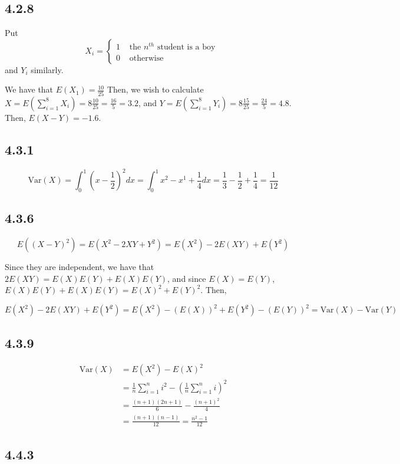 \documentclass[12pt,letterpaper]{article}
\theoremstyle{definition}
\newcommand{\var}[1]{\text{Var}\left(#1\right)}
\begin{document}
\subsection*{4.2.8}

Put
\[
  X_i =
  \begin{cases}
    1 & \text{ the $n^{th}$ student is a boy } \\
    0 & \text{ otherwise }
  \end{cases}
\]
and $Y_i$ similarly.

We have that $E(X_1) = \frac{10}{25}$
Then, we wish to calculate $X = E(\sum_{i=1}^8 X_i) = 8\frac{10}{25} = \frac{16}{5}
= 3.2$, and $Y = E(\sum_{i=1}^8 Y_i) = 8\frac{15}{25} = \frac{24}{5} = 4.8$.
Then, $E(X - Y) = -1.6$.

\subsection*{4.3.1}

\[
  \var{X} = \int_0^1(x - \frac{1}{2})^2 dx = \int_0^1x^2 - x^1 + \frac{1}{4} dx
  = \frac{1}{3} - \frac{1}{2} + \frac{1}{4} = \frac{1}{12}
\]

\subsection*{4.3.6}

\[
  E((X - Y)^2) = E(X^2 - 2XY + Y^2) = E(X^2) - 2E(XY) + E(Y^2)
\]

Since they are independent, we have that $2E(XY) = E(X)E(Y) + E(X)E(Y)$, and
since $E(X) = E(Y)$, $E(X)E(Y) + E(X)E(Y) = E(X)^2 + E(Y)^2$. Then,

\[
  E(X^2) - 2E(XY) + E(Y^2) = E(X^2) - (E(X))^2 + E(Y^2) - (E(Y))^2 = \var{X} - \var{Y}
\]

\subsection*{4.3.9}

\begin{align*}
  \var{X} &= E(X^2) - E(X)^2 \\
          &= \frac{1}{n}\sum_{i=1}^n i^2 - (\frac{1}{n}\sum_{i=1}^n i)^2 \\
          &= \frac{(n+1)(2n+1)}{6} - \frac{(n+1)^2}{4} \\
          &= \frac{(n+1)(n-1)}{12} = \frac{n^2 - 1}{12}
\end{align*}

\subsection*{4.4.3}
\end{document}
